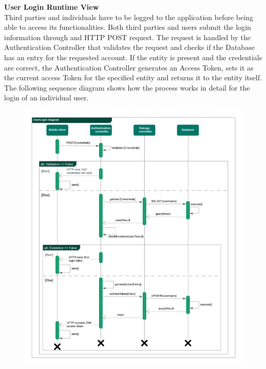 \begin{legal}
\begin{legal}
				\newpage
				\item \textbf{User Login Runtime View}\\
Third parties and individuals have to be logged to the application before being able to access its functionalities.
Both third parties and users submit the login information through and HTTP POST request.
The request is handled by the Authentication Controller that validates the request and checks if the Database has an entry for the requested account. If the entity is present and the credentials are correct, the Authentication Controller generates an Access Token, sets it as the current access Token for the specified entity and returns it to the entity itself.
The following sequence diagram shows how the process works in detail for the login of an individual user.\\
				\begin{figure}[H]
				\includegraphics[width=\linewidth]{images/seq_diagrams/seq_UserLogin.png}\\
				\end{figure}
				

\end{legal}
\end{legal}

